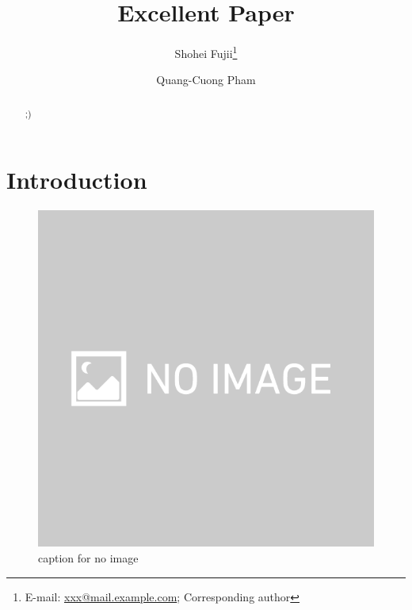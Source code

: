 \documentclass[letterpaper, 10 pt, conference]{ieeeconf}  %
\begin{document}
\title{\bf{\LARGE{{Excellent Paper}}}}

\author[1,2]{Shohei Fujii\thanks{E-mail: \href{mailto:xxx@mail.example.com}{xxx@mail.example.com}; Corresponding author} }
\author[1,3]{Quang-Cuong Pham}
\maketitle


\begin{abstract}
;)
\end{abstract}

\section{Introduction}
\begin{figure}[t]
  \begin{center}
  \includegraphics[width=1.0\linewidth]{./image/noimage.png}
  \caption{caption for no image}
  \label{fig:noimage}
  \end{center}
\end{figure}


%
\end{document}
